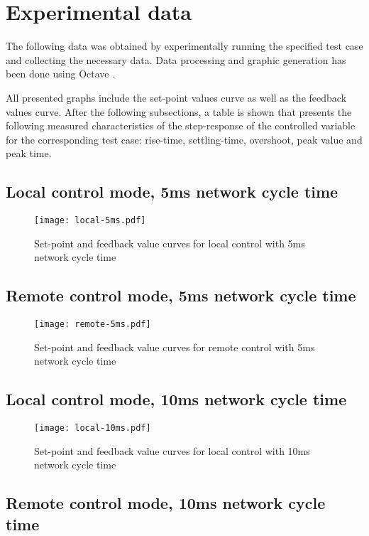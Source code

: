 \section{Experimental data}
The following data was obtained by experimentally running the specified test case and collecting the necessary data.
Data processing and graphic generation has been done using Octave \cite{sw:octave}.

All presented graphs include the set-point values curve as well as the feedback values curve.
After the following subsections, a table is shown that presents the following measured characteristics of the step-response of the controlled variable for the corresponding test case: rise-time, settling-time, overshoot, peak value and peak time.

\subsection{Local control mode, 5ms network cycle time}

\begin{figure}[htp]
	\centering
	\texttt{[image: local-5ms.pdf]}
	\caption{Set-point and feedback value curves for local control with 5ms network cycle time}
	\label{fig:local-5ms}
\end{figure}

\subsection{Remote control mode, 5ms network cycle time}

\begin{figure}[htp]
	\centering
	\texttt{[image: remote-5ms.pdf]}
	\caption{Set-point and feedback value curves for remote control with 5ms network cycle time}
	\label{fig:remote-5ms}
\end{figure}

\subsection{Local control mode, 10ms network cycle time}

\begin{figure}[htp]
	\centering
	\texttt{[image: local-10ms.pdf]}
	\caption{Set-point and feedback value curves for local control with 10ms network cycle time}
	\label{fig:local-10ms}
\end{figure}

\subsection{Remote control mode, 10ms network cycle time}

